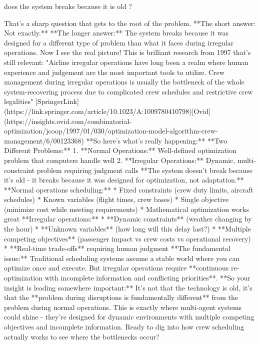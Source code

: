 \begin{userprompt}
does the system breaks because it is old ?
\end{userprompt}

\begin{botresponse}
That's a sharp question that gets to the root of the problem.
**The short answer: Not exactly.**
**The longer answer:** The system breaks because it was designed for a different type of problem than what it faces during irregular operations.
Now I see the real picture! This is brilliant research from 1997 that's still relevant:
"Airline irregular operations have long been a realm where human experience and judgement are the most important tools to utilize. Crew management during irregular operations is usually the bottleneck of the whole system-recovering process due to complicated crew schedules and restrictive crew legalities" [SpringerLink](https://link.springer.com/article/10.1023/A:1009780410798)[Ovid](https://insights.ovid.com/combinatorial-optimization/jcoop/1997/01/030/optimization-model-algorithm-crew-management/6/00123368)
**So here's what's really happening:**
**Two Different Problems:**
1.  **Normal Operations:** Well-defined optimization problem that computers handle well
2.  **Irregular Operations:** Dynamic, multi-constraint problem requiring judgment calls
**The system doesn't break because it's old - it breaks because it was designed for optimization, not adaptation.**
**Normal operations scheduling:**
*   Fixed constraints (crew duty limits, aircraft schedules)
*   Known variables (flight times, crew bases)
*   Single objective (minimize cost while meeting requirements)
*   Mathematical optimization works great
**Irregular operations:**
*   **Dynamic constraints** (weather changing by the hour)
*   **Unknown variables** (how long will this delay last?)
*   **Multiple competing objectives** (passenger impact vs crew costs vs operational recovery)
*   **Real-time trade-offs** requiring human judgment
**The fundamental issue:** Traditional scheduling systems assume a stable world where you can optimize once and execute. But irregular operations require **continuous re-optimization with incomplete information and conflicting priorities**.
**So your insight is leading somewhere important:** It's not that the technology is old, it's that the **problem during disruptions is fundamentally different** from the problem during normal operations.
This is exactly where multi-agent systems could shine - they're designed for dynamic environments with multiple competing objectives and incomplete information.
Ready to dig into how crew scheduling actually works to see where the bottlenecks occur?
\end{botresponse}

